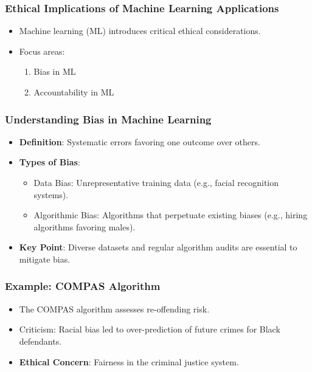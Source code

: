 \documentclass[aspectratio=169]{beamer}
\begin{document}
\begin{frame}[fragile]
    \frametitle{Ethical Implications of Machine Learning Applications}
    \begin{itemize}
        \item Machine learning (ML) introduces critical ethical considerations.
        \item Focus areas:
        \begin{enumerate}
            \item Bias in ML
            \item Accountability in ML
        \end{enumerate}
    \end{itemize}
\end{frame}

\begin{frame}[fragile]
    \frametitle{Understanding Bias in Machine Learning}
    \begin{itemize}
        \item \textbf{Definition}: Systematic errors favoring one outcome over others.
        \item \textbf{Types of Bias}:
        \begin{itemize}
            \item Data Bias: Unrepresentative training data (e.g., facial recognition systems).
            \item Algorithmic Bias: Algorithms that perpetuate existing biases (e.g., hiring algorithms favoring males).
        \end{itemize}
        \item \textbf{Key Point}: Diverse datasets and regular algorithm audits are essential to mitigate bias.
    \end{itemize}
\end{frame}

\begin{frame}[fragile]
    \frametitle{Example: COMPAS Algorithm}
    \begin{itemize}
        \item The COMPAS algorithm assesses re-offending risk.
        \item Criticism: Racial bias led to over-prediction of future crimes for Black defendants.
        \item \textbf{Ethical Concern}: Fairness in the criminal justice system.
    \end{itemize}
\end{frame}
\end{document}

